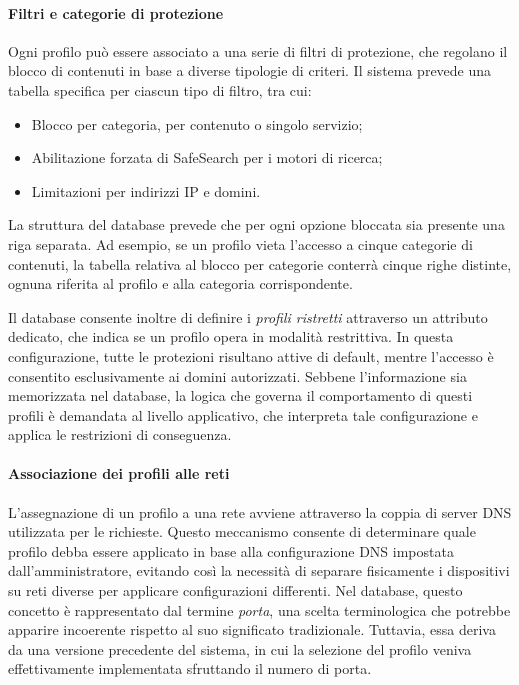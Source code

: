 \paragraph{Filtri e categorie di protezione}
Ogni profilo può essere associato a una serie di filtri di protezione, che regolano il blocco di contenuti in base a diverse tipologie di criteri. Il sistema prevede una tabella specifica per ciascun tipo di filtro, tra cui:
\begin{itemize}
  \item Blocco per categoria, per contenuto o singolo servizio;
  \item Abilitazione forzata di SafeSearch per i motori di ricerca;
  \item Limitazioni per indirizzi IP e domini.
\end{itemize}
La struttura del database prevede che per ogni opzione bloccata sia presente una riga separata. Ad esempio, se un profilo vieta l’accesso a cinque categorie di contenuti, la tabella relativa al blocco per categorie conterrà cinque righe distinte, ognuna riferita al profilo e alla categoria corrispondente.

Il database consente inoltre di definire i \emph{profili ristretti} attraverso un attributo dedicato, che indica se un profilo opera in modalità restrittiva. In questa configurazione, tutte le protezioni risultano attive di default, mentre l’accesso è consentito esclusivamente ai domini autorizzati. Sebbene l’informazione sia memorizzata nel database, la logica che governa il comportamento di questi profili è demandata al livello applicativo, che interpreta tale configurazione e applica le restrizioni di conseguenza.

\paragraph{Associazione dei profili alle reti}
L’assegnazione di un profilo a una rete avviene attraverso la coppia di server DNS utilizzata per le richieste. Questo meccanismo consente di determinare quale profilo debba essere applicato in base alla configurazione DNS impostata dall’amministratore, evitando così la necessità di separare fisicamente i dispositivi su reti diverse per applicare configurazioni differenti. Nel database, questo concetto è rappresentato dal termine \emph{porta}, una scelta terminologica che potrebbe apparire incoerente rispetto al suo significato tradizionale. Tuttavia, essa deriva da una versione precedente del sistema, in cui la selezione del profilo veniva effettivamente implementata sfruttando il numero di porta.

